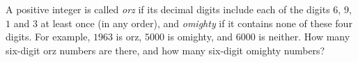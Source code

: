 A positive integer is called \emph{orz} if its decimal digits include each of the digits $6$, $9$, $1$ and $3$ at least once (in any order), and \emph{omighty} if it contains none of these four digits. For example, $1963$ is orz, $5000$ is omighty, and $6000$ is neither. How many six-digit orz numbers are there, and how many six-digit omighty numbers?
